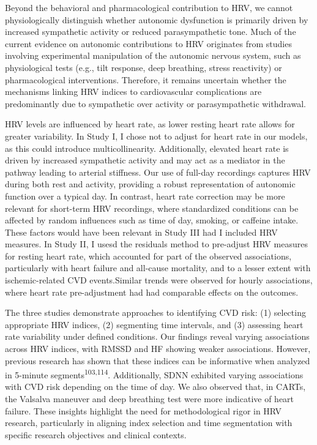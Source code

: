 \documentclass[
  a4paper,
  headsepline=true,
  open=any]{scrbook}
\begin{document}
Beyond the behavioral and pharmacological contribution to HRV, we cannot
physiologically distinguish whether autonomic dysfunction is primarily
driven by increased sympathetic activity or reduced parasympathetic
tone. Much of the current evidence on autonomic contributions to HRV
originates from studies involving experimental manipulation of the
autonomic nervous system, such as physiological tests (e.g., tilt
response, deep breathing, stress reactivity) or pharmacological
interventions. Therefore, it remains uncertain whether the mechanisms
linking HRV indices to cardiovascular complications are predominantly
due to sympathetic over activity or parasympathetic withdrawal.

HRV levels are influenced by heart rate, as lower resting heart rate
allows for greater variability. In Study I, I chose not to adjust for
heart rate in our models, as this could introduce multicollinearity.
Additionally, elevated heart rate is driven by increased sympathetic
activity and may act as a mediator in the pathway leading to arterial
stiffness. Our use of full-day recordings captures HRV during both rest
and activity, providing a robust representation of autonomic function
over a typical day. In contrast, heart rate correction may be more
relevant for short-term HRV recordings, where standardized conditions
can be affected by random influences such as time of day, smoking, or
caffeine intake. These factors would have been relevant in Study III had
I included HRV measures. In Study II, I usesd the residuals method to
pre-adjust HRV measures for resting heart rate, which accounted for part
of the observed associations, particularly with heart failure and
all-cause mortality, and to a lesser extent with ischemic-related CVD
events.Similar trends were observed for hourly associations, where heart
rate pre-adjustment had had comparable effects on the outcomes.

The three studies demonstrate approaches to identifying CVD risk: (1)
selecting appropriate HRV indices, (2) segmenting time intervals, and
(3) assessing heart rate variability under defined conditions. Our
findings reveal varying associations across HRV indices, with RMSSD and
HF showing weaker associations. However, previous research has shown
that these indices can be informative when analyzed in 5-minute
segments\textsuperscript{103,114}. Additionally, SDNN exhibited varying
associations with CVD risk depending on the time of day. We also
observed that, in CARTs, the Valsalva maneuver and deep breathing test
were more indicative of heart failure. These insights highlight the need
for methodological rigor in HRV research, particularly in aligning index
selection and time segmentation with specific research objectives and
clinical contexts.
\end{document}
